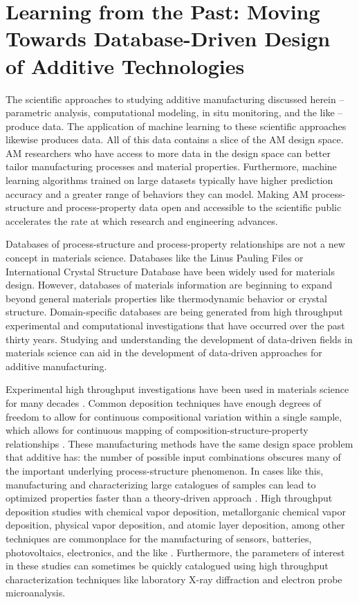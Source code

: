 \section{Learning from the Past: Moving Towards Database-Driven Design of Additive Technologies}
The scientific approaches to studying additive manufacturing discussed herein -- parametric analysis, computational modeling, in situ monitoring, and the like -- produce data. The application of machine learning to these scientific approaches likewise produces data. All of this data contains a slice of the AM design space. AM researchers who have access to more data in the design space can better tailor manufacturing processes and material properties. Furthermore, machine learning algorithms trained on large datasets typically have higher prediction accuracy and a greater range of behaviors they can model. Making AM process-structure and process-property data open and accessible to the scientific public accelerates the rate at which research and engineering advances.

Databases of process-structure and process-property relationships are not a new concept in materials science. Databases like the Linus Pauling Files or International Crystal Structure Database have been widely used for materials design. However, databases of materials information are beginning to expand beyond general materials properties like thermodynamic behavior or crystal structure. Domain-specific databases are being generated from high throughput experimental and computational investigations that have occurred over the past thirty years. Studying and understanding the development of data-driven fields in materials science can aid in the development of data-driven approaches for additive manufacturing. 

Experimental high throughput investigations have been used in materials science for many decades \cite{Xiang1995}. Common deposition techniques have enough degrees of freedom to allow for continuous compositional variation within a single sample, which allows for continuous mapping of composition-structure-property relationships \cite{Long2007, Long2009, Kusne2015a}. These manufacturing methods have the same design space problem that additive has: the number of possible input combinations obscures many of the important underlying process-structure phenomenon. In cases like this, manufacturing and characterizing large catalogues of samples can lead to optimized properties faster than a theory-driven approach \cite{Ceder1998, Pilania2013}. High throughput deposition studies with chemical vapor deposition, metallorganic chemical vapor deposition, physical vapor deposition, and atomic layer deposition, among other techniques are commonplace for the manufacturing of sensors, batteries, photovoltaics, electronics, and the like \cite{Hampden-Smith1995, Gilmer1998, Mercey1999, Mitzi2001}. Furthermore, the parameters of interest in these studies can sometimes be quickly catalogued using high throughput characterization techniques like laboratory X-ray diffraction and electron probe microanalysis. 

